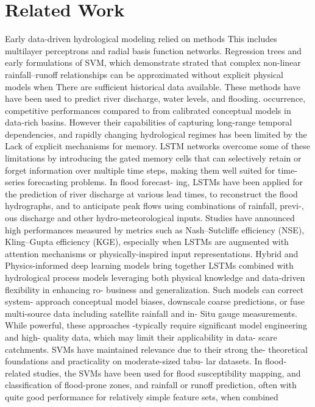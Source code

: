\documentclass[conference]{IEEEtran}
\begin{document}
\section{Related Work}
Early data-driven hydrological modeling relied on methods
This includes multilayer perceptrons and radial basis function networks.
Regression trees and early formulations of SVM, which demonstrate
strated that complex non-linear rainfall–runoff relationships
can be approximated without explicit physical models when
There are sufficient historical data available. These methods have
have been used to predict river discharge, water levels, and flooding.
occurrence, competitive performances compared to
from calibrated conceptual models in data-rich basins. However
their capabilities of capturing long-range temporal dependencies, and
rapidly changing hydrological regimes has been limited by the
Lack of explicit mechanisms for memory.
LSTM networks overcome some of these limitations by
introducing the gated memory cells that can selectively retain or
forget information over multiple time steps, making them well
suited for time-series forecasting problems. In flood forecast-
ing, LSTMs have been applied for the prediction of river discharge at
various lead times, to reconstruct the flood hydrographs, and to
anticipate peak flows using combinations of rainfall, previ-,
ous discharge and other hydro-meteorological inputs. Studies
have announced high performances measured by metrics such as
Nash–Sutcliffe efficiency (NSE), Kling–Gupta efficiency
(KGE), especially when LSTMs are augmented with attention
mechanisms or physically-inspired input representations.
Hybrid and Physics-informed deep learning models bring together
LSTMs combined with hydrological process models leveraging both
physical knowledge and data-driven flexibility in enhancing ro-
business and generalization. Such models can correct system-
approach conceptual model biases, downscale coarse predictions,
or fuse multi-source data including satellite rainfall and in-
Situ gauge measurements. While powerful, these approaches
-typically require significant model engineering and high-
quality data, which may limit their applicability in data-
scare catchments.
SVMs have maintained relevance due to their strong the-
theoretical foundations and practicality on moderate-sized tabu-
lar datasets. In flood-related studies, the SVMs have been used
for flood susceptibility mapping, and classification of flood-prone
zones, and rainfall or runoff prediction, often with quite good
performance for relatively simple feature sets, when combined
\end{document}
